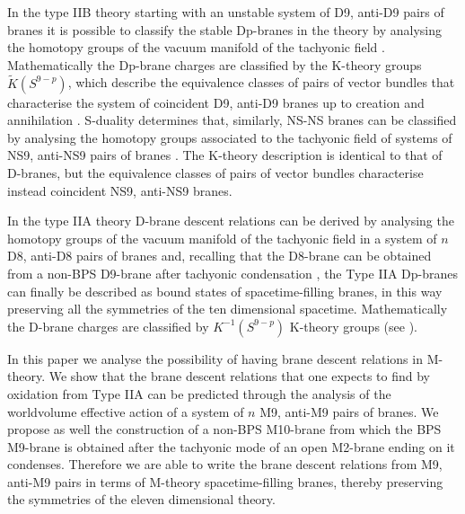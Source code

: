 \documentclass[12pt,a4paper]{article}
\begin{document}
In the type IIB theory starting with an unstable system of D9, anti-D9
pairs of branes it is possible to classify the stable Dp-branes 
in the theory by analysing the homotopy groups of the vacuum
manifold of the tachyonic field \cite{Witten}.
Mathematically the Dp-brane charges are
classified by the K-theory groups ${\tilde K}(S^{9-p})$,
which describe the equivalence classes
of pairs of vector bundles that characterise the system of coincident
D9, anti-D9 branes up to creation and annihilation \cite{Witten}. 
S-duality determines that, similarly, NS-NS branes can be 
classified by analysing the
homotopy groups associated to the tachyonic field of systems of
NS9, anti-NS9 pairs of branes \cite{HL2}. 
The K-theory description is identical
to that of D-branes, but the equivalence classes of pairs of vector
bundles characterise instead coincident NS9, anti-NS9 branes.

In the type IIA theory D-brane descent relations can be derived by 
analysing the homotopy groups of the vacuum manifold of the tachyonic 
field in a system of $n$ D8, anti-D8 pairs of branes and, 
recalling that the D8-brane
can be obtained from a non-BPS D9-brane after tachyonic condensation
\cite{Horava}, the Type IIA Dp-branes can finally be described as 
bound states of spacetime-filling branes, in this way preserving all the
symmetries of the ten dimensional spacetime. Mathematically the
D-brane charges are classified by $K^{-1}(S^{9-p})$ K-theory groups
(see \cite{Horava}).

In this paper we analyse the possibility of having 
brane descent relations in M-theory. We show that the brane descent
relations that one expects
to find by oxidation from Type IIA can be
predicted through the analysis of the worldvolume effective action of a
system of $n$ M9, anti-M9 pairs of branes.
We propose  as well the construction of a non-BPS M10-brane from which the BPS M9-brane
is obtained after the tachyonic mode of an open M2-brane ending 
on it condenses. Therefore we are able to write the brane descent 
relations from M9, anti-M9 pairs in terms of M-theory 
spacetime-filling branes, thereby preserving the symmetries of the
eleven dimensional theory.
\end{document}
